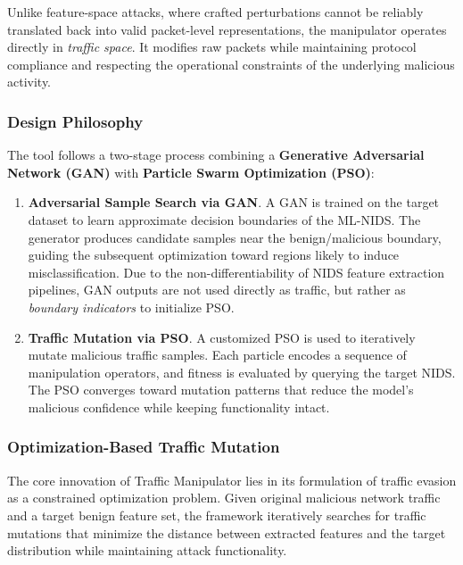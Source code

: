 Unlike feature-space attacks, where crafted perturbations cannot be reliably translated back into valid packet-level representations, the manipulator operates directly in \emph{traffic space}. It modifies raw packets while maintaining protocol compliance and respecting the operational constraints of the underlying malicious activity.

\subsubsection{Design Philosophy}

The tool follows a two-stage process combining a \textbf{Generative Adversarial Network (GAN)} with \textbf{Particle Swarm Optimization (PSO)}:

\begin{enumerate}
    \item \textbf{Adversarial Sample Search via GAN}.  
    A GAN is trained on the target dataset to learn approximate decision boundaries of the ML-NIDS.  
    The generator produces candidate samples near the benign/malicious boundary, guiding the subsequent optimization toward regions likely to induce misclassification.  
    Due to the non-differentiability of NIDS feature extraction pipelines, GAN outputs are not used directly as traffic, but rather as \emph{boundary indicators} to initialize PSO.

    \item \textbf{Traffic Mutation via PSO}.  
    A customized PSO is used to iteratively mutate malicious traffic samples.  
    Each particle encodes a sequence of manipulation operators, and fitness is evaluated by querying the target NIDS.  
    The PSO converges toward mutation patterns that reduce the model’s malicious confidence while keeping functionality intact.
\end{enumerate}

\subsubsection{Optimization-Based Traffic Mutation}

The core innovation of Traffic Manipulator lies in its formulation of traffic evasion as a constrained optimization problem. Given original malicious network traffic and a target benign feature set, the framework iteratively searches for traffic mutations that minimize the distance between extracted features and the target distribution while maintaining attack functionality.

